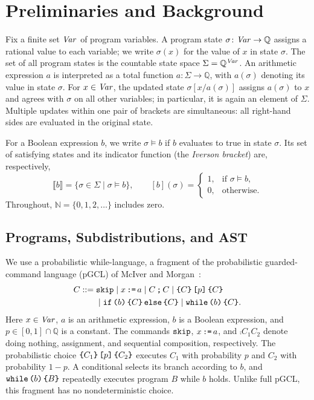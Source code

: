 \section{Preliminaries and Background}
\label{sec:prelims}

Fix a finite set $\mathit{Var}$ of program variables.
A program state $\sigma \colon \mathit{Var} \to \mathbb{Q}$ assigns
a rational value to each variable; we write $\sigma(x)$ for the
value of $x$ in state $\sigma$.
The set of all program states is the countable state space
$\Sigma = \mathbb{Q}^{\mathit{Var}}$.
An arithmetic expression $a$ is interpreted as a total function
$a \colon \Sigma \to \mathbb{Q}$, with $a(\sigma)$ denoting its
value in state $\sigma$.
For $x \in \mathit{Var}$, the updated state $\sigma[x/a(\sigma)]$
assigns $a(\sigma)$ to $x$ and agrees with $\sigma$ on all other
variables; in particular, it is again an element of $\Sigma$.
Multiple updates within one pair of brackets are simultaneous:
all right-hand sides are evaluated in the original state.

For a Boolean expression $b$, we write $\sigma \models b$ if $b$
evaluates to true in state $\sigma$.
Its set of satisfying states and its indicator function
(the \emph{Iverson bracket}) are, respectively,
\[
  \llbracket b \rrbracket
  = \{ \sigma \in \Sigma \mid \sigma \models b \},
  \qquad
  [b](\sigma)
  =
  \begin{cases}
    1, & \text{if } \sigma \models b,\\
    0, & \text{otherwise}.
  \end{cases}
\]
Throughout, $\mathbb{N} = \{0,1,2,\ldots\}$ includes zero.

\subsection{Programs, Subdistributions, and AST}

We use a probabilistic while-language, a fragment of the probabilistic
guarded-command language (pGCL) of McIver and
Morgan~\cite{DBLP:series/mcs/McIverM05}:
\[
 \begin{aligned}
 C &::= \ski\mid\ass{x}{a}\mid\comp{C}{C}\mid\pchoice{C}{p}{C}\\
   &\phantom{{}::={}}\mid\ifelse{b}{C}{C}\mid\while{b}{C}.
 \end{aligned}
\]
Here $x\in\mathit{Var}$, $a$ is an arithmetic expression, $b$ is a Boolean
expression, and $p\in[0,1]\cap\mathbb Q$ is a constant.
The commands $\textnormal{\texttt{skip}}$, $x\,\textnormal{\texttt{:=}}\, a$, and $\comp{C_1}{C_2}$ denote
doing nothing, assignment, and sequential
composition, respectively. The probabilistic choice
$\textnormal{\texttt{\{}} C_1\textnormal{\texttt{\}}} \, \textnormal{\texttt{[}} p\textnormal{\texttt{]}} \, \textnormal{\texttt{\{}} C_2\textnormal{\texttt{\}}}$ executes $C_1$ with probability $p$ and $C_2$
with probability $1-p$. A conditional selects its branch according to
$b$, and $\textnormal{\texttt{while}}\,\textnormal{\texttt{(}} b\textnormal{\texttt{)}}\,\textnormal{\texttt{\{}} B\textnormal{\texttt{\}}}$ repeatedly executes program $B$ while $b$ holds.
Unlike full pGCL, this fragment has no nondeterministic choice.

